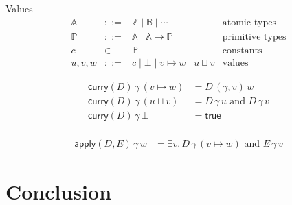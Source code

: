 \documentclass{article}
\newcommand{\true}[0]{\mathsf{true}}
\newcommand{\curry}[1]{\mathsf{curry}(#1)}
\newcommand{\apply}[2]{\mathsf{apply}(#1, #2)}
\begin{document}
Values
\[
\begin{array}{lcll}
  \mathbb{A} & ::= & \mathbb{Z} \mid \mathbb{B} \mid \cdots & \text{atomic types}\\
  \mathbb{P} & ::= & \mathbb{A} \mid \mathbb{A} \to \mathbb{P} & \text{primitive types}\\
  c & \in & \mathbb{P} & \text{constants} \\
  u,v,w & ::= & c \mid \bot \mid v \mapsto w \mid u \sqcup v & \text{values}
\end{array}
\]

\begin{align*}
  \curry{D}\, \gamma\, (v \mapsto w) &= D \,(\gamma,v)\, w\\
  \curry{D}\, \gamma\, (u \sqcup v) &= D \,\gamma\, u \text{ and } D\, \gamma\, v \\
  \curry{D}\, \gamma\, \bot &= \true \\
\end{align*}


\begin{align*}
  \apply{D}{E}\,\gamma\,w &=
    \exists v.\, D\,\gamma\,(v \mapsto w) \text{ and } E \, \gamma \, v
\end{align*}

\section{Conclusion}



\end{document}
